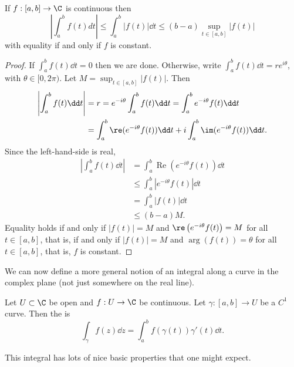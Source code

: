 \begin{proposition}
    If $f: [a, b] \rightarrow \C$ is continuous then
    $$
    \left|\int_{a}^{b} f(t) d t\right| \leq \int_{a}^{b}|f(t)| \dd t \leq(b-a) \sup _{t \in[a, b]}|f(t)|
    $$
    with equality if and only if $f$ is constant.
\end{proposition}
\begin{proof}
    If $\int_a^b f(t) \dd t = 0$ then we are done. Otherwise, write $\int_a^b f(t) \dd t = re^{i \theta}$, with $\theta \in [0, 2\pi)$. Let $M = \sup_{t \in [a, b]} |f(t)|$. Then
    \begin{align*}
        \left|\int_a^b f(t) \dd t\right| &= r = e^{-i \theta} \int_a^b f(t) \dd t = \int_a^b e^{-i \theta} f(t) \dd t \\
        &= \int_a^b \re(e^{-i \theta} f(t)) \dd t + i \int_a^b \im(e^{- i \theta} f(t)) \dd t.
    \end{align*}
    Since the left-hand-side is real,
    \begin{align*}
        \left|\int_{a}^{b} f(t) \dd t\right|&=\int_{a}^{b} \operatorname{Re}\left(e^{-i \theta} f(t)\right) \dd t \\
        &\leq \int_{a}^{b}\left|e^{-i \theta} f(t)\right| \dd t \\
        &= \int_a^b |f(t)| \dd t \\
        & \leq (b - a) M.
    \end{align*}
    Equality holds if and only if $|f(t)|=M$ and $\re\left(e^{-i \theta} f(t)\right)=M$ for all $t \in[a, b]$, that is, if and only if $|f(t)|=M$ and $\arg (f(t))=\theta$ for all $t \in[a, b]$, that is, $f$ is constant.
\end{proof}

We can now define a more general notion of an integral along a curve in the complex plane (not just somewhere on the real line).

\begin{definition}
    Let $U \subset \C$ be open and $f: U \rightarrow \C$ be continuous. Let $\gamma: [a, b]  \rightarrow U$ be a $C^1$ curve. Then the  is
    $$
    \int_{\gamma} f(z) \dd z = \int_a^b f(\gamma(t)) \gamma'(t) \dd t.
    $$
\end{definition}

This integral has lots of nice basic properties that one might expect.

